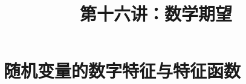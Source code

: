 \documentclass[Prob-All.tex]{subfiles}
\begin{document}
\title[概率论]{第十六讲：数学期望}
\date{}













{ 
  \begin{frame}
    \titlepage
  \end{frame}
}



\section{随机变量的数字特征与特征函数}
\end{document}

